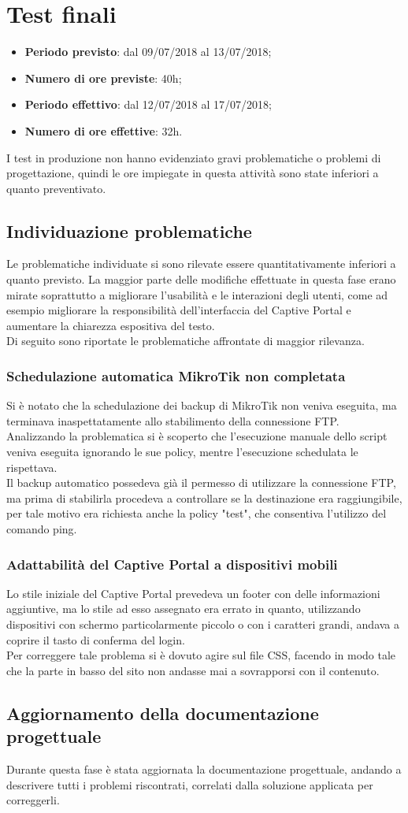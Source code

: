 \documentclass[Realizzazione.tex]{subfiles}
\begin{document}
\section{Test finali	}
\begin{itemize}
	\item \textbf{Periodo previsto}: dal 09/07/2018 al 13/07/2018;
	\item \textbf{Numero di ore previste}: 40h;
	\item \textbf{Periodo effettivo}: dal 12/07/2018 al 17/07/2018;
	\item \textbf{Numero di ore effettive}: 32h.
\end{itemize}
I test in produzione non hanno evidenziato gravi problematiche o problemi di progettazione, quindi le ore impiegate in questa attività sono state inferiori a quanto preventivato.

\subsection{Individuazione problematiche}
Le problematiche individuate si sono rilevate essere quantitativamente inferiori a quanto previsto. La maggior parte delle modifiche effettuate in questa fase erano mirate soprattutto a migliorare l'usabilità e le interazioni degli utenti, come ad esempio migliorare la responsibilità dell'interfaccia del Captive Portal e aumentare la chiarezza espositiva del testo.\\
Di seguito sono riportate le problematiche affrontate di maggior rilevanza.

\subsubsection{Schedulazione automatica MikroTik non completata}
Si è notato che la schedulazione dei backup di MikroTik non veniva eseguita, ma terminava inaspettatamente allo stabilimento della connessione FTP. \\
Analizzando la problematica si è scoperto che l'esecuzione manuale dello script veniva eseguita ignorando le sue policy, mentre l'esecuzione schedulata le rispettava.\\
Il backup automatico possedeva già il permesso di utilizzare la connessione FTP, ma prima di stabilirla procedeva a controllare se la destinazione era raggiungibile, per tale motivo era richiesta anche la policy "test", che consentiva l'utilizzo del comando ping.

\subsubsection{Adattabilità del Captive Portal a dispositivi mobili}
Lo stile iniziale del Captive Portal prevedeva un footer con delle informazioni aggiuntive, ma lo stile ad esso assegnato era errato in quanto, utilizzando dispositivi con schermo particolarmente piccolo o con i caratteri grandi, andava a coprire il tasto di conferma del login. \\
Per correggere tale problema si è dovuto agire sul file CSS, facendo in modo tale che la parte in basso del sito non andasse mai a sovrapporsi con il contenuto.

\subsection{Aggiornamento della documentazione progettuale}
Durante questa fase è stata aggiornata la documentazione progettuale, andando a descrivere tutti i problemi riscontrati, correlati dalla soluzione applicata per correggerli.
\end{document}
